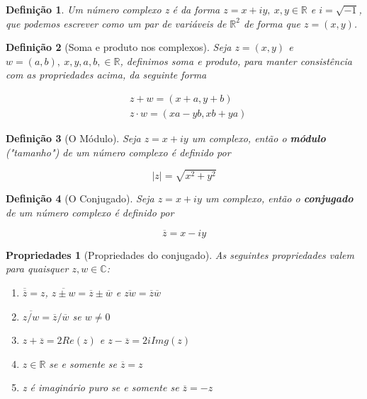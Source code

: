 \documentclass{article}
\newtheorem{prop}{Propriedades}
\newtheorem{definition}{Definição}
\begin{document}
\begin{definition}
Um número complexo z é da forma $z = x + iy, \ x,y \in \mathbb{R}$ e $i = \sqrt{-1}$, que podemos escrever como um par de variáveis de $\mathbb{R}^2$ de forma que $z = (x, y)$.
\end{definition}

\begin{definition}[Soma e produto nos complexos]
Seja $z = (x, y)$ e $w = (a, b),\ x,y,a,b, \in \mathbb{R}$, definimos soma e produto, para manter consistência com as propriedades acima, da seguinte forma

\begin{align}
    &z + w = (x + a, y + b) \nonumber \\
    &z \cdot w = (xa - yb, xb + ya) \nonumber
\end{align}
\end{definition}

\begin{definition}[O Módulo]
Seja $z = x + iy$ um complexo, então o \textbf{módulo} ("tamanho") de um número complexo é definido por

$$\mid z \mid = \sqrt{x^2 + y^2}$$
\end{definition}

\begin{definition}[O Conjugado]
Seja $z = x + iy$ um complexo, então o \textbf{conjugado} de um número complexo é definido por

$$\overline{z} = x - i y$$
\end{definition}

\begin{prop}[Propriedades do conjugado] As seguintes propriedades valem para quaisquer $z, w \in \mathbb{C}$:

\begin{enumerate}[label=(\alph*)]
    \item $\overline{\overline{z}} = z$, $\overline{z \pm w} = \overline{z} \pm \overline{w}$ e $\overline{z w} = \overline{z} \overline{w}$
    
    \item $\overline{z/w} = \overline{z}/\overline{w}$ se $w \neq 0$
    
    \item $z + \overline{z} = 2 Re(z)$ e $z - \overline{z} = 2i Img(z)$
    
    \item $z \in \mathbb{R}$ se e somente se $\overline{z} = z$
    
    \item z é imaginário puro se e somente se $\overline{z} = -z$
\end{enumerate}
\end{prop}
\end{document}
